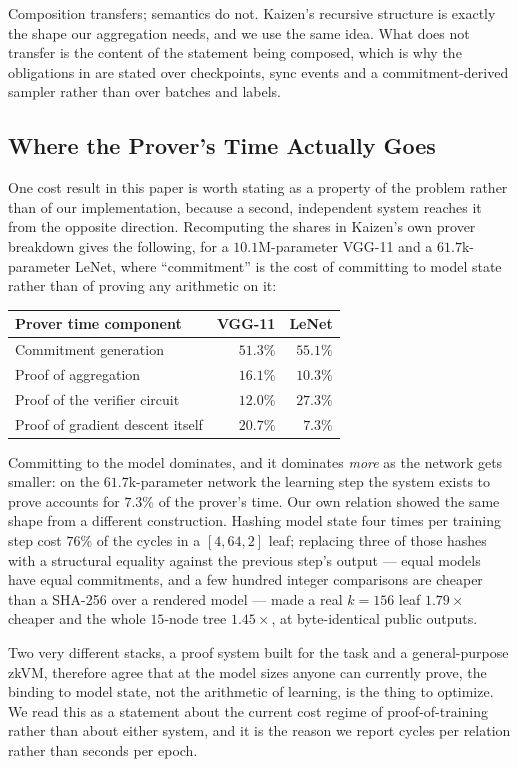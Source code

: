 \noindent Composition transfers; semantics do not. Kaizen's recursive structure
is exactly the shape our aggregation needs, and we use the same idea. What does
not transfer is the content of the statement being composed, which is why the
obligations in  are stated over checkpoints, sync events
and a commitment-derived sampler rather than over batches and labels.

\subsection{Where the Prover's Time Actually Goes}
\label{subsec:cost-shape}

One cost result in this paper is worth stating as a property of the problem
rather than of our implementation, because a second, independent system reaches
it from the opposite direction. Recomputing the shares in Kaizen's own prover
breakdown gives the following, for a $10.1$M-parameter VGG-11 and a
$61.7$k-parameter LeNet, where ``commitment'' is the cost of committing
to model state rather than of proving any arithmetic on it:

\begin{center}\footnotesize
\begin{tabular}{@{}lrr@{}}
\toprule
\textbf{Prover time component} & \textbf{VGG-11} & \textbf{LeNet} \\
\midrule
Commitment generation & $51.3\%$ & $55.1\%$ \\
Proof of aggregation & $16.1\%$ & $10.3\%$ \\
Proof of the verifier circuit & $12.0\%$ & $27.3\%$ \\
Proof of gradient descent itself & $20.7\%$ & $7.3\%$ \\
\bottomrule
\end{tabular}
\end{center}

\bigskip
\noindent Committing to the model dominates, and it dominates \emph{more} as
the network gets smaller: on the $61.7$k-parameter network the learning step
the system exists to prove accounts for $7.3\%$ of the prover's time. Our own
relation showed the same shape from a different construction. Hashing model
state four times per training step cost $76\%$ of the cycles in a $[4,64,2]$
leaf; replacing three of those hashes with a structural equality against the
previous step's output --- equal models have equal commitments, and a few
hundred integer comparisons are cheaper than a SHA-256 over a rendered model
--- made a real $k=156$ leaf $1.79\times$ cheaper and the whole $15$-node tree
$1.45\times$, at byte-identical public outputs.

Two very different stacks, a proof system built for the task and a
general-purpose zkVM, therefore agree that at the model sizes anyone can
currently prove, the
binding to model state, not the arithmetic of learning, is the thing to
optimize. We read this as a statement about the current cost regime of
proof-of-training rather than about either system, and it is the reason we
report cycles per relation rather than seconds per epoch.

